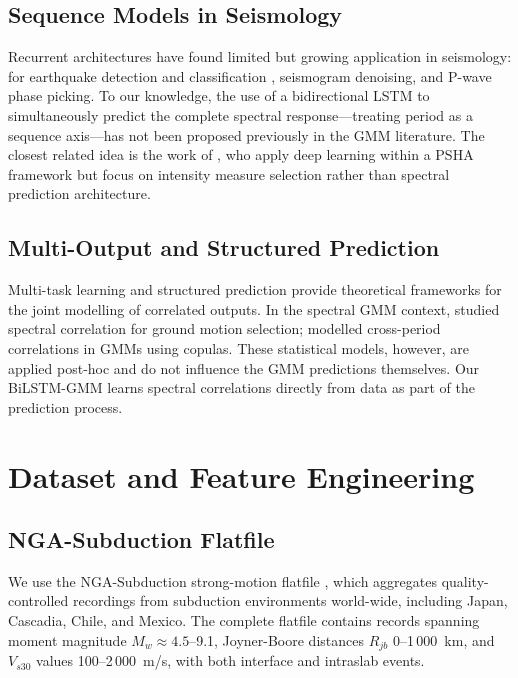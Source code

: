 \documentclass[12pt,a4paper]{article}
\begin{document}
\subsection{Sequence Models in Seismology}

Recurrent architectures have found limited but growing application in
seismology: for earthquake detection and classification \citep{Perol2018},
seismogram denoising, and P-wave phase picking.
To our knowledge, the use of a bidirectional LSTM to simultaneously predict the
complete spectral response---treating period as a sequence axis---has not been
proposed previously in the GMM literature.
The closest related idea is the work of \citet{Bayona2022}, who apply deep
learning within a PSHA framework but focus on intensity measure selection rather
than spectral prediction architecture.

\subsection{Multi-Output and Structured Prediction}

Multi-task learning \citep{Caruana1997} and structured prediction
\citep{Bakir2007} provide theoretical frameworks for the joint modelling of
correlated outputs.
In the spectral GMM context, \citet{Baker2008} studied spectral correlation
for ground motion selection; \citet{Jayaram2009} modelled cross-period
correlations in GMMs using copulas.
These statistical models, however, are applied post-hoc and do not influence
the GMM predictions themselves.
Our BiLSTM-GMM learns spectral correlations directly from data as part of the
prediction process.

\section{Dataset and Feature Engineering}
\label{sec:data}

\subsection{NGA-Subduction Flatfile}

We use the NGA-Subduction strong-motion flatfile \citep{Bozorgnia2014}, which
aggregates quality-controlled recordings from subduction environments world-wide,
including Japan, Cascadia, Chile, and Mexico.
The complete flatfile contains records spanning moment magnitude
$M_w \approx 4.5$--9.1, Joyner-Boore distances $R_{jb}$ 0--1\,000~km, and
$V_{s30}$ values 100--2\,000~m/s, with both interface and intraslab events.
\end{document}

